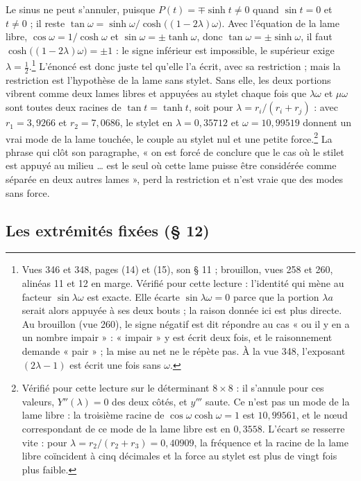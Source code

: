 \documentclass[11pt,a4paper]{article}
\begin{document}
Le sinus ne peut s'annuler, puisque $P(t)=\mp\sinh t\neq0$ quand $\sin t=0$ et $t\neq0$ ; il reste $\tan\omega=\sinh\omega/\cosh\bigl((1-2\lambda)\omega\bigr)$. Avec l'équation de la lame libre, $\cos\omega=1/\cosh\omega$ et $\sin\omega=\pm\tanh\omega$, donc $\tan\omega=\pm\sinh\omega$, il faut $\cosh\bigl((1-2\lambda)\omega\bigr)=\pm1$ : le signe inférieur est impossible, le supérieur exige $\lambda=\frac12$.\footnote{Vues 346 et 348, pages (14) et (15), son § 11 ; brouillon, vues 258 et 260, alinéas 11 et 12 en marge. Vérifié pour cette lecture : l'identité qui mène au facteur $\sin\lambda\omega$ est exacte. Elle écarte $\sin\lambda\omega=0$ parce que la portion $\lambda a$ serait alors appuyée à ses deux bouts ; la raison donnée ici est plus directe. Au brouillon (vue 260), le signe négatif est dit répondre au cas « ou il y en a un nombre impair » : « impair » y est écrit deux fois, et le raisonnement demande « pair » ; la mise au net ne le répète pas. À la vue 348, l'exposant $(2\lambda-1)$ est écrit une fois sans $\omega$.} L'énoncé est donc juste tel qu'elle l'a écrit, avec sa restriction ; mais la restriction est l'hypothèse de la lame sans stylet. Sans elle, les deux portions vibrent comme deux lames libres et appuyées au stylet chaque fois que $\lambda\omega$ et $\mu\omega$ sont toutes deux racines de $\tan t=\tanh t$, soit pour $\lambda=r_i/(r_i+r_j)$ : avec $r_1=3{,}9266$ et $r_2=7{,}0686$, le stylet en $\lambda=0{,}35712$ et $\omega=10{,}99519$ donnent un vrai mode de la lame touchée, le couple au stylet nul et une petite force.\footnote{Vérifié pour cette lecture sur le déterminant $8\times8$ : il s'annule pour ces valeurs, $Y''(\lambda)=0$ des deux côtés, et $y'''$ saute. Ce n'est pas un mode de la lame libre : la troisième racine de $\cos\omega\cosh\omega=1$ est $10{,}99561$, et le nœud correspondant de ce mode de la lame libre est en $0{,}3558$. L'écart se resserre vite : pour $\lambda=r_2/(r_2+r_3)=0{,}40909$, la fréquence et la racine de la lame libre coïncident à cinq décimales et la force au stylet est plus de vingt fois plus faible.} La phrase qui clôt son paragraphe, « on est forcé de conclure que le cas où le stilet est appuyé au milieu … est le seul où cette lame puisse être considérée comme séparée en deux autres lames », perd la restriction et n'est vraie que des modes sans force.

\subsection*{Les extrémités fixées (§ 12)}
\end{document}
